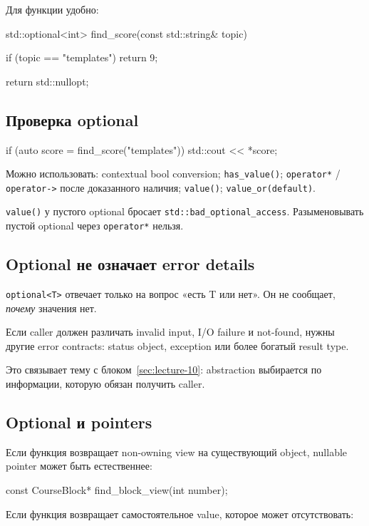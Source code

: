 Для функции удобно:

\begin{cppcode}
std::optional<int> find_score(const std::string& topic) {
    if (topic == "templates") {
        return 9;
    }

    return std::nullopt;
}
\end{cppcode}

\subsection{Проверка optional}

\begin{cppcode}
if (auto score = find_score("templates")) {
    std::cout << *score;
}
\end{cppcode}

Можно использовать:
contextual bool conversion; \texttt{has\_value()}; \texttt{operator*} / \texttt{operator->} после доказанного наличия; \texttt{value()}; \texttt{value\_or(default)}.

\texttt{value()} у пустого optional бросает
\texttt{std::bad\_optional\_access}. Разыменовывать пустой optional через
\texttt{operator*} нельзя.

\subsection{Optional не означает error details}

\texttt{optional<T>} отвечает только на вопрос «есть T или нет». Он не сообщает,
\emph{почему} значения нет.

Если caller должен различать invalid input, I/O failure и not-found, нужны
другие error contracts: status object, exception или более богатый result type.

Это связывает тему с блоком~\ref{sec:lecture-10}: abstraction выбирается по
информации, которую обязан получить caller.

\subsection{Optional и pointers}

Если функция возвращает non-owning view на существующий object, nullable pointer
может быть естественнее:

\begin{cppcode}
const CourseBlock* find_block_view(int number);
\end{cppcode}

Если функция возвращает самостоятельное value, которое может отсутствовать:

